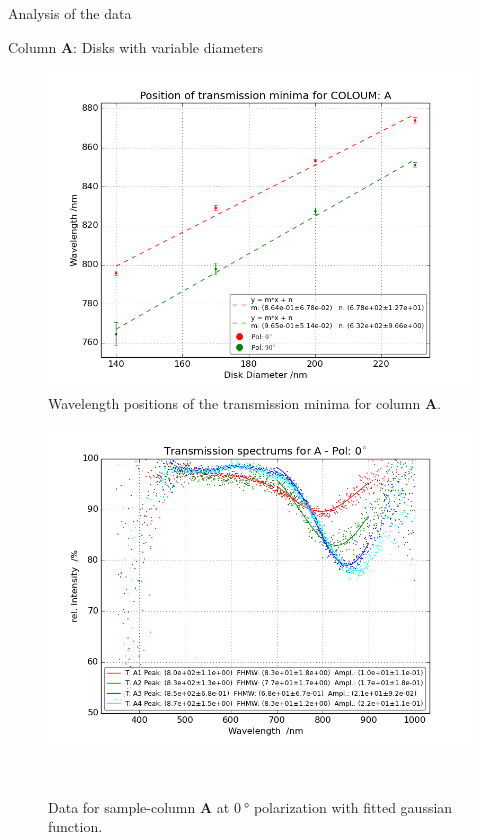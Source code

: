 \documentclass[pdftex, a4paper,11pt, twoside, UKenglish]{report}
\begin{document}
\begin{chapter}{Analysis of the data}
\begin{section}{Column \textbf{A}: Disks with variable diameters}
\begin{figure}[b!]
        \includegraphics[width=\textwidth]{Figures/MinimaPosA.png}
        \caption{Wavelength positions of the transmission minima for column
            \textbf{A}.}
        \label{fig:MinimaPosA}
      \end{figure}
      \newpage
      \begin{figure}[ht!]
        \centering
        \begin{minipage}{.95\textwidth}
          \centering
          \includegraphics[width=\textwidth]
              {Figures/TransspecFIT_APol0.png}
          \caption{Data for sample-column \textbf{A} at $\SI{0}{\degree}$
              polarization with fitted gaussian function.}
          \label{fig:TransspecFIT_APol0}
        \end{minipage}\\

\end{figure}
\end{section}
\end{chapter}
\end{document}
